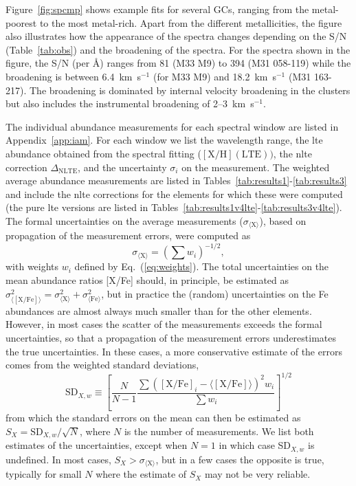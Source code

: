 \documentclass{aa}
\begin{document}
Figure~\ref{fig:spcmp} shows example fits for several GCs, ranging from the metal-poorest to the most metal-rich. Apart from the different metallicities, the figure also illustrates how the appearance of the spectra changes depending on the S/N (Table~\ref{tab:obs}) and the broadening of the spectra. 
For the spectra shown in the figure, the S/N (per \AA) ranges from 81 (M33 M9) to 394 (M31 058-119) while the broadening is between 6.4~km~s$^{-1}$ (for M33 M9) and 18.2~km~s$^{-1}$ (M31 163-217). The broadening is dominated by internal velocity broadening in the clusters but also includes the instrumental broadening of 2--3~km~s$^{-1}$. 

The individual abundance measurements for each spectral window are listed in Appendix~\ref{app:iam}. For each window we list the wavelength range, the \ac{lte} abundance obtained from the spectral fitting ($\mathrm{[X/H]}(\mathrm{LTE}))$, the \ac{nlte} correction $\Delta_\mathrm{NLTE}$, and the uncertainty $\sigma_i$ on the measurement. 
The weighted average abundance measurements are listed in Tables~\ref{tab:results1}-\ref{tab:results3} and include the \ac{nlte} corrections for the elements for which these were computed (the pure \ac{lte} versions are listed in Tables~\ref{tab:results1v4lte}-\ref{tab:results3v4lte}). 
The formal uncertainties on the average measurements ($\sigma_{\langle \mathrm{X}\rangle}$), based on propagation of the measurement errors, were computed as
%
\begin{equation}
\sigma_{\langle \mathrm{X}\rangle}  = \left(\sum w_i\right)^{-1/2} ,
\end{equation}
%
with weights $w_i$ defined by Eq.~(\ref{eq:weights}). The total uncertainties on the mean abundance ratios [X/Fe] should, in principle, be estimated as $\sigma_{\langle\mathrm{[X/Fe]}\rangle}^2 = \sigma_{\langle\mathrm{X}\rangle}^2 + \sigma_{\langle\mathrm{Fe}\rangle}^2$, but in practice the (random) uncertainties on the Fe abundances are almost always much smaller than for the other elements.
However, in most cases the scatter of the measurements exceeds the formal uncertainties, so that a propagation of the measurement errors underestimates the true uncertainties. In these cases, a more conservative estimate of the errors comes from the weighted standard deviations,
%
\begin{equation}
\mathrm{SD}_{X,w} \equiv \left[\frac{N}{N-1} \frac{\sum  \left(\mathrm{[X/Fe]}_i - \langle \mathrm{[X/Fe]} \rangle\right)^2 w_i}{\sum w_i}\right]^{1/2}
\end{equation}
%
from which the standard errors on the mean can then be estimated as $S_X = \mathrm{SD}_{X,w} / \sqrt{N}$, where $N$ is the number of measurements. We list both estimates of the uncertainties, except when $N=1$ in which case SD$_{X,w}$ is undefined.
In most cases, $S_X > \sigma_{\langle \mathrm{X}\rangle}$, but in a few cases the opposite is true, typically for small $N$ where the estimate of $S_X$ may not be very reliable. 
\end{document}
